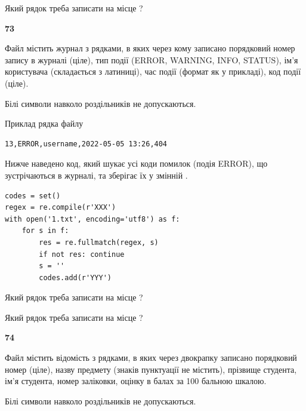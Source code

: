 Який рядок треба записати на місце  ?\par


\newpage

{\begin {center}\textbf{ 73}\end {center}}\par
Файл  містить журнал з рядками, в яких через кому записано поряд\-ко\-вий номер запису в журналі (ціле), тип події (ERROR, WARNING, INFO, STATUS), ім'я користувача (складається з латиниці), час події (фор\-мат як у прикладі), код події (ціле).

Білі символи навколо роздільників не допускаються.

Приклад рядка файлу



\begin{verbatim}
13,ERROR,username,2022-05-05 13:26,404
\end{verbatim}


Нижче наведено код, який шукає усі коди помилок (подія ERROR), що зустріча\-ють\-ся в журналі, та зберігає їх у змінній .



\begin{verbatim}
codes = set()
regex = re.compile(r'XXX')
with open('1.txt', encoding='utf8') as f:
    for s in f:
        res = re.fullmatch(regex, s)
        if not res: continue
        s = ''
        codes.add(r'YYY')
\end{verbatim}





Який рядок треба записати на місце  ?\par
\vspace{5mm}


Який рядок треба записати на місце  ?\par


\newpage

{\begin {center}\textbf{ 74}\end {center}}\par
Файл  містить відомість з рядками, в яких через двокрапку записа\-но поряд\-ковий номер (ціле), назву предмету (знаків пунктуації не містить), прізвище студента, ім'я студента, номер заліковки, оцінку в балах за 100 бальною шкалою.

Білі символи навколо роздільників не допускаються.

